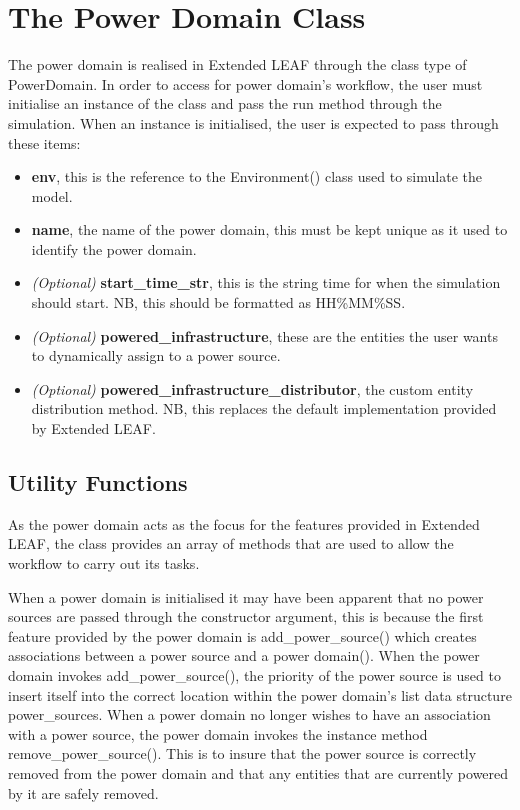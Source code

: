 \documentclass{l4proj}
\begin{document}
\section{The Power Domain Class}\label{sec:power-domain}
The power domain is realised in Extended LEAF through the class type of PowerDomain.
In order to access for power domain's workflow, the user must initialise an instance of the class and pass the run method through the simulation.
When an instance is initialised, the user is expected to pass through these items:
\begin{itemize}
    \item \textbf{env}, this is the reference to the Environment() class used to simulate the model.
    \item \textbf{name}, the name of the power domain, this must be kept unique as it used to identify the power domain.
    \item \textit{(Optional)} \textbf{start\_time\_str}, this is the string time for when the simulation should start. NB, this should be formatted as HH\%MM\%SS.
    \item \textit{(Optional)} \textbf{powered\_infrastructure}, these are the entities the user wants to dynamically assign to a power source.
    \item \textit{(Optional)} \textbf{powered\_infrastructure\_distributor}, the custom entity distribution method. NB, this replaces the default implementation provided by Extended LEAF.
\end{itemize}

\subsection{Utility Functions}\label{imp:subsec:utility}
As the power domain acts as the focus for the features provided in Extended LEAF, the class provides an array of methods that are used to allow the workflow to carry out its tasks.

When a power domain is initialised it may have been apparent that no power sources are passed through the constructor argument, this is because the first feature provided by the power domain is add\_power\_source() which creates associations between a power source and a power domain().
When the power domain invokes add\_power\_source(), the priority of the power source is used to insert itself into the correct location within the power domain's list data structure power\_sources.
When a power domain no longer wishes to have an association with a power source, the power domain invokes the instance method remove\_power\_source().
This is to insure that the power source is correctly removed from the power domain and that any entities that are currently powered by it are safely removed.
\end{document}
